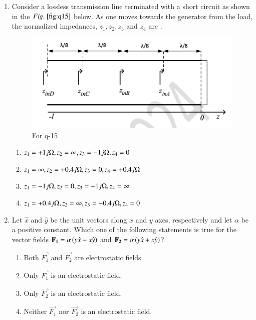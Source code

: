 \documentclass[journal,12pt,onecolumn]{IEEEtran}
\theoremstyle{remark}
\begin{document}
\begin{enumerate}
\item Consider a lossless transmission line terminated with a short circuit as shown in the $\figref{fig:q15}$ below. As one moves towards the generator from the load, the normalized impedances, $z_1, z_2, z_3$ and $z_4$  are \underline{\hspace{2cm}}.
\begin{figure}[H]
    \centering
    \includegraphics[width=0.7\columnwidth]{q15.png}
    \caption{For q-15}
    \label{fig:q15}
\end{figure}
\hfill{}
\begin{enumerate}
    \item $z_1 = +1j \ohm , z_2 = \infty , z_3 = -1j \ohm , z_4 = 0$
    \item $z_1 = \infty , z_2 = +0.4j \ohm , z_3 = 0 , z_4 = +0.4j \ohm$
    \item $z_1 = -1j \ohm , z_2 = 0, z_3 = +1j \ohm , z_4 = \infty$
    \item $z_1 = +0.4j \ohm , z_2 = \infty, z_3 = -0.4j \ohm , z_4 = 0$
\end{enumerate}

\item Let $\hat{x}$ and $\hat{y}$ be the unit vectors along $x$ and $y$ axes, respectively and let $\alpha$ be a positive constant. Which one of the following statements is true for the vector fields $\mathbf{F_1} = \alpha\left(y\hat{x} - x\hat{y}\right)$ and $\mathbf{F_2} = \alpha\left(y\hat{x} + x\hat{y}\right)$?
\hfill{}
\begin{multicols}{2}
    \begin{enumerate}
    \item Both $\vec{F_1}$ and $\vec{F_2}$ are electrostatic fields.
    \item Only $\vec{F_1}$ is an electrostatic field.
    \item Only $\vec{F_2}$ is an electrostatic field.
    \item Neither $\vec{F_1}$ nor $\vec{F_2}$ is an electrostatic field.
\end{enumerate}
\end{multicols}



\end{enumerate}
\end{document}
